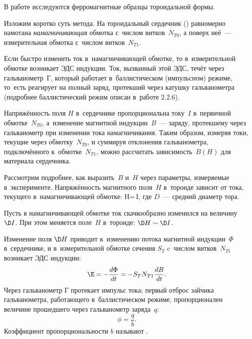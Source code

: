 В работе исследуются ферромагнитные образцы тороидальной формы.

\begin{figure}[hbt]
\hfil
{}
\hfil\hfil
{}
\end{figure}

Изложим коротко суть метода. На тороидальный сердечник () равномерно намотана \emph{намагничивающая} обмотка
с~числом витков~$N_{T0}$, а поверх неё~--- {измерительная} обмотка с~числом витков~$N_{T1}$.

Если быстро изменить ток в~намагничивающей обмотке, то в~измерительной обмотке возникает ЭДС индукции. Ток, вызванный
этой ЭДС, течёт через гальванометр~Г, который работает в~баллистическом (импульсном) режиме, то~есть реагирует на полный
заряд, протекший через катушку гальванометра (подробнее баллистический режим описан в~работе 2.2.6).

Напряжённость поля $H$ в~сердечнике пропорциональна току~$I$ в~первичной обмотке~$N_{T0}$, а~изменение магнитной
индукции~$B$~--- заряду, протекшему через гальванометр при изменении тока намагничивания. Таким образом, измеряя токи,
текущие через обмотку~$N_{T0}$, и суммируя отклонения гальванометра, подключённого к~обмотке~$N_{T1}$, можно рассчитать
зависимость~$B(H)$ для материала сердечника.

\etp

Рассмотрим подробнее, как выразить~$B$ и~$H$ через параметры, измеряемые в~эксперименте. Напряжённость магнитного
поля~$H$ в~тороиде зависит от тока, текущего в~намагничивающей обмотке:
H=\,I,
\ee
где $D$~--- средний диаметр тора.

Пусть в намагничивающей обмотке ток скачкообразно изменился на величину~$\D I$. При этом меняется поле~$H$ в~тороиде:
$\D H\sim\D I$.

Изменение поля $\D H$ приводит к~изменению потока магнитной индукции~$\Phi$ в~сердечнике, и в~измерительной обмотке
сечения $S_T$ c~числом витков~$N_{T1}$ возникает ЭДС индукции:
\[
\E=-\frac{d\Phi}{dt}=-S_T N_{T1}\frac{dB}{dt}.
\]
Через гальванометр Г протекает импульс тока; первый отброс зайчика гальванометра, работающего в~баллистическом режиме,
пропорционален величине прошедшего через гальванометр заряда~$q$:
\[
\phi=\frac{q}{b}.
\]
Коэффициент пропорциональности $b$ называют .

